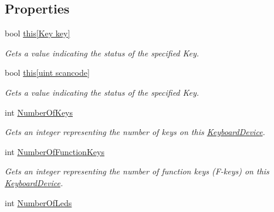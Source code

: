 \subsection*{Properties}
\begin{DoxyCompactItemize}
\item 
bool \hyperlink{class_open_t_k_1_1_input_1_1_keyboard_device_a3ae0bcae2f72d9e593a1abd58f3510a4}{this\mbox{[}\-Key key\mbox{]}}
\begin{DoxyCompactList}\small\item\em Gets a value indicating the status of the specified Key. \end{DoxyCompactList}\item 
bool \hyperlink{class_open_t_k_1_1_input_1_1_keyboard_device_aa352ed059cb4a2b3127bf307bcdc72ce}{this\mbox{[}uint scancode\mbox{]}}
\begin{DoxyCompactList}\small\item\em Gets a value indicating the status of the specified Key. \end{DoxyCompactList}\item 
int \hyperlink{class_open_t_k_1_1_input_1_1_keyboard_device_a8cdb6aa74d46585a6eac945d9460ebb8}{Number\-Of\-Keys}
\begin{DoxyCompactList}\small\item\em Gets an integer representing the number of keys on this \hyperlink{class_open_t_k_1_1_input_1_1_keyboard_device}{Keyboard\-Device}. \end{DoxyCompactList}\item 
int \hyperlink{class_open_t_k_1_1_input_1_1_keyboard_device_ac00e15c29e8b700cf8ec409c24ecc15f}{Number\-Of\-Function\-Keys}
\begin{DoxyCompactList}\small\item\em Gets an integer representing the number of function keys (F-\/keys) on this \hyperlink{class_open_t_k_1_1_input_1_1_keyboard_device}{Keyboard\-Device}. \end{DoxyCompactList}\item 
int \hyperlink{class_open_t_k_1_1_input_1_1_keyboard_device_a72f5d5169869c62419219ddbb4ae0077}{Number\-Of\-Leds}

\end{DoxyCompactItemize}
